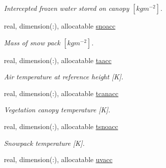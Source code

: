 \begin{DoxyCompactItemize}
\begin{DoxyCompactList}\small\item\em Intercepted frozen water stored on canopy $[kg m^{-2} ]$. \end{DoxyCompactList}\item 
\hypertarget{structclass__statevars_1_1class__rotated_a97fec96f5d1646dac0c8e6ff17a7dcf6}{}real, dimension(\+:), allocatable \hyperlink{structclass__statevars_1_1class__rotated_a97fec96f5d1646dac0c8e6ff17a7dcf6}{snoacc}\label{structclass__statevars_1_1class__rotated_a97fec96f5d1646dac0c8e6ff17a7dcf6}

\begin{DoxyCompactList}\small\item\em Mass of snow pack $[kg m^{-2} ]$. \end{DoxyCompactList}\item 
\hypertarget{structclass__statevars_1_1class__rotated_a5700d3be82b21f99aaf68016dbc9dd16}{}real, dimension(\+:), allocatable \hyperlink{structclass__statevars_1_1class__rotated_a5700d3be82b21f99aaf68016dbc9dd16}{taacc}\label{structclass__statevars_1_1class__rotated_a5700d3be82b21f99aaf68016dbc9dd16}

\begin{DoxyCompactList}\small\item\em Air temperature at reference height \mbox{[}K\mbox{]}. \end{DoxyCompactList}\item 
\hypertarget{structclass__statevars_1_1class__rotated_a788b06d3396a41e78c2f170d98583c73}{}real, dimension(\+:), allocatable \hyperlink{structclass__statevars_1_1class__rotated_a788b06d3396a41e78c2f170d98583c73}{tcanacc}\label{structclass__statevars_1_1class__rotated_a788b06d3396a41e78c2f170d98583c73}

\begin{DoxyCompactList}\small\item\em Vegetation canopy temperature \mbox{[}K\mbox{]}. \end{DoxyCompactList}\item 
\hypertarget{structclass__statevars_1_1class__rotated_a2c5d2fa22a634eb31fe273ee6ef6b324}{}real, dimension(\+:), allocatable \hyperlink{structclass__statevars_1_1class__rotated_a2c5d2fa22a634eb31fe273ee6ef6b324}{tsnoacc}\label{structclass__statevars_1_1class__rotated_a2c5d2fa22a634eb31fe273ee6ef6b324}

\begin{DoxyCompactList}\small\item\em Snowpack temperature \mbox{[}K\mbox{]}. \end{DoxyCompactList}\item 
\hypertarget{structclass__statevars_1_1class__rotated_aae72e76f70568ede9034d99ea41c4d52}{}real, dimension(\+:), allocatable \hyperlink{structclass__statevars_1_1class__rotated_aae72e76f70568ede9034d99ea41c4d52}{uvacc}\label{structclass__statevars_1_1class__rotated_aae72e76f70568ede9034d99ea41c4d52}


\end{DoxyCompactItemize}
